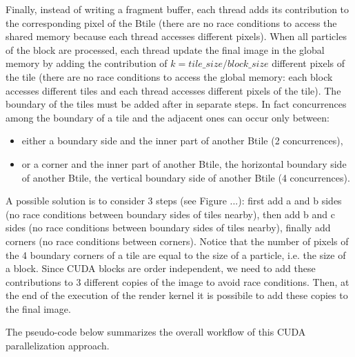 \documentclass[11pt]{article}
\begin{document}
Finally, instead of writing a fragment buffer, each thread adds its contribution to the corresponding pixel of the Btile (there are no race conditions to access the shared memory because each thread accesses different pixels). 
When all particles of the block are processed, each thread update the final image in the global memory 
by adding the contribution of $k = tile\_size/block\_size$ different pixels of the tile (there are no race conditions to access the global memory: each block accesses different tiles and each thread accesses different pixels of the tile). The boundary of the tiles must be added after in separate steps. In fact concurrences among the boundary of a tile and the adjacent ones can occur only between:
\begin{itemize}
\item
either a boundary side and the inner part of another Btile (2 concurrences), 
\item
or a corner and the inner part of another Btile, the horizontal boundary side of another Btile, the vertical boundary side of another Btile (4 concurrences). 
\end{itemize}
A possible solution is to consider 3 steps (see Figure ...):  
first add a and b sides (no race conditions between boundary sides of tiles nearby),
then add b and c sides (no race conditions between boundary sides of tiles nearby),
finally add corners (no race conditions between corners). Notice that the number of pixels of the 4 boundary corners of a tile are equal to the size of a particle, i.e. the size of a block. Since CUDA blocks are order independent, we need to add these contributions to 3 different copies of the image to avoid race conditions. Then, at the end of the execution of the render kernel it is possibile to add these copies to the final image.

The pseudo-code below summarizes the overall workflow of this CUDA parallelization approach.
\end{document}

